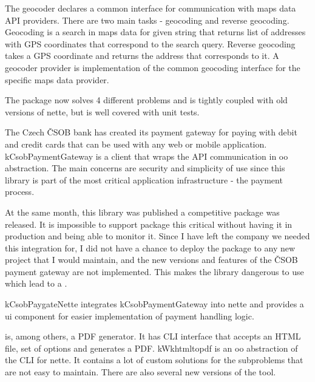 The geo\-co\-de\-r declares a common interface for communication with maps data API providers. There are two main tasks - geocoding and reverse geocoding. Geocoding is a search in maps data for given string that returns list of addresses with GPS coordinates that correspond to the search query. Reverse geocoding takes a GPS coordinate and returns the address that corresponds to it. A geo\-co\-de\-r provider is implementation of the common geocoding interface for the specific maps data provider.

The package now solves 4 different problems and is tightly coupled with old versions of \gls{nette}, but is well covered with unit tests.

 \label{sec:state:csob-payment-gateway}

The Czech ČSOB bank has created its payment gateway for paying with debit and credit cards that can be used with any web or mobile application. \gls{kCsobPaymentGateway} is a client that wraps the API communication in \gls{oo} abstraction. The main concerns are security and simplicity of use since this library is part of the most critical application infrastructure - the payment process.

At the same month, this library was published a competitive package  was released. It is impossible to support package this critical without having it in production and being able to monitor it. Since I have left the company we needed this integration for, I did not have a chance to deploy the package to any new project that I would maintain, and the new versions and features of the ČSOB payment gateway are not implemented. This makes the library dangerous to use which lead to a .

 \label{sec:state:csob-paygate-nette}

\gls{kCsobPaygateNette} integrates \gls{kCsobPaymentGateway} into \gls{nette} and provides a \gls{ui} component for easier implementation of payment handling logic.

 \label{sec:state:wkhtmltopdf}

 is, among others, a PDF generator. It has CLI interface that accepts an HTML file, set of options and generates a PDF. \gls{kWkhtmltopdf} is an \gls{oo} abstraction of the CLI for \gls{nette}. It contains a lot of custom solutions for the subproblems that are not easy to maintain. There are also several new versions of the tool.

